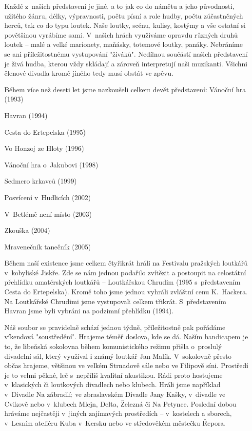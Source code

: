 \documentclass[a5paper, 11pt, twoside]{article}
\begin{document}
Každé z~našich představení je jiné, a to jak co do námětu a jeho
původnosti, užitého žánru, délky, výpravnosti, počtu písní a role hudby,
počtu zúčastněných herců, tak co do typu loutek. Naše loutky, scénu,
kulisy, kostýmy a vše ostatní si povětšinou vyrábíme sami. V~našich
hrách využíváme opravdu různých druhů loutek -- malé a velké marionety,
maňásky, totemové loutky, panáky. Nebráníme se ani příležitostnému
vystupování "živáků". Nedílnou součástí našich představení je živá
hudba, kterou vždy skládají a zároveň interpretují naši muzikanti.
Všichni členové divadla kromě jiného tedy musí obstát ve zpěvu.

Během více než deseti let jsme nazkoušeli celkem devět představení:
\medskip
Vánoční hra (1993)

Havran (1994)

Cesta do Ertepelska (1995)

Vo Honzoj ze Hloty (1996)

Vánoční hra o~Jakubovi (1998)

Sedmero krkavců (1999)

Posvícení v~Hudlicích (2002)

V~Betlémě není místo (2003)

Zkouška (2004)

Mravenečník tanečník (2005)

\medskip

Během naší existence jsme celkem čtyřikrát hráli na Festivalu pražských
loutkářů v~kobyliské Jiskře. Zde se nám jednou podařilo zvítězit a
postoupit na celostátní přehlídku amatérských loutkářů -- Loutkářskou
Chrudim (1995 s~představením Cesta do Ertepelska). Kromě toho jsme
jednou vyhráli zvláštní cenu K.~Hackera. Na Loutkářské Chrudimi jsme
vystupovali celkem třikrát. S~představením Havran jsme byli vybráni na
podzimní přehlídku (1994).

Náš soubor se pravidelně schází jednou týdně, příležitostně pak pořádáme
víkendová "soustředění". Hrajeme téměř doslova, kde se dá. Naším
handicapem je to, že libeňská sokolovna během komunistického režimu
přišla o~proslulý divadelní sál, který využíval i známý loutkář Jan
Malík. V~sokolovně přesto občas hrajeme, většinou ve velkém Strnadově
sále nebo ve Filipově síni. Prostředí je to velmi pěkné, leč s~nepříliš
kvalitní akustikou. Rádi proto hostujeme v~klasických či loutkových
divadlech nebo klubech. Hráli jsme například v~Divadle Na zábradlí; ve
zbraslavském Divadle Jany Kašky, v~divadle ve Cvikově nebo v~klubech
Mlejn, Delta, Železná či Na Petynce. Poslední dobou hráváme nejčastěji
v~jiných zajímavých prostředích -- v~kostelech a sborech, v~Lesním
ateliéru Kuba v~Kersku nebo ve středověkém městečku Řepora.
\end{document}
